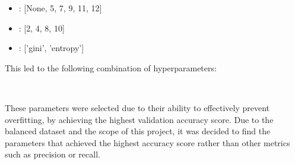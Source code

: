 \begin{center}
    \begin{minipage}{3in}

\begin{itemize}
    \item {}: [None, 5, 7, 9, 11, 12]
    \item {}: [2, 4, 8, 10]
    \item {}: ['gini', 'entropy'] \\
\end{itemize}
            \end{minipage}
\end{center}


This led to the following combination of hyperparameters:\\
\begin{tcolorbox}[colback=white,
                  arc=0pt,
                outer=0pt]
\centering {} \, \,  \, \, \\
   \end{tcolorbox}

These parameters were selected due to their ability to effectively prevent overfitting, by achieving the highest validation accuracy score.
Due to the balanced dataset and the scope of this project, it was decided to find the parameters that achieved the highest accuracy score rather than other metrics such as precision or recall.
